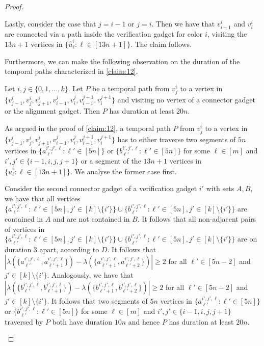 \documentclass[a4paper,UKenglish,cleveref, autoref, thm-restate]{lipics-v2021}
\begin{document}
\begin{proof}
\begin{claimproof}
    Lastly, consider the case that $j=i-1$ or $j=i$. Then we have that $v^i_{i-1}$ and $v^i_i$ are connected via a path inside the verification gadget for color $i$, visiting the $13n+1$ vertices in $\{\hat{u}^i_\ell :  \ell\in[13n+1]\}$. The claim follows.
\end{claimproof}
Furthermore, we can make the following observation on the duration of the temporal paths characterized in \cref{claim:12}.
\begin{claim}\label{claim:13}
    Let $i,j\in\{0,1,\ldots,k\}$. Let $P$ be a temporal path from $v^i_j$ to a vertex in $\{v^i_{j-1},v^i_j,v^i_{j+1},v^j_{i-1},v^j_i,v^{j+1}_{i-1},v^{j+1}_i\}$ and visiting no vertex of a connector gadget or the alignment gadget. Then $P$ has duration at least $20n$.
\end{claim}
\begin{claimproof}
    As argued in the proof of \cref{claim:12}, a temporal path $P$ from $v^i_j$ to a vertex in $\{v^i_{j-1},v^i_j,v^i_{j+1},v^j_{i-1},v^j_i,v^{j+1}_{i-1},v^{j+1}_i\}$ has to either traverse two segments of $5n$ vertices in $\{a^{i',j',\ell}_{\ell'} :  \ell'\in[5n]\}$ or $\{b^{i',j',\ell}_{\ell'} :  \ell'\in[5n]\}$ for some $\ell\in[m]$ and $i',j'\in\{i-1,i,j,j+1\}$ or a segment of the $13n+1$ vertices in $\{\hat{u}^i_\ell :  \ell\in[13n+1]\}$. We analyse the former case first.
    
    Consider the second connector gadget of a verification gadget $i'$ with sets $A,B$, we have that all vertices $\{a^{i',j',\ell}_{\ell'} :  \ell'\in[5n],j'\in[k]\setminus\{i'\}\}\cup\{b^{i',j',\ell}_{\ell'} :  \ell'\in[5n],j'\in[k]\setminus\{i'\}\}$ are contained in $A$ and are not contained in $B$. It follows that all non-adjacent pairs of vertices in $\{a^{i',j',\ell}_{\ell'} :  \ell'\in[5n],j'\in[k]\setminus\{i'\}\}\cup\{b^{i',j',\ell}_{\ell'} :  \ell'\in[5n],j'\in[k]\setminus\{i'\}\}$ are on duration $3$ apart, according to $D$. It follows that $|\lambda(\{a^{i',j',\ell}_{\ell'},a^{i',j',\ell}_{\ell'+1}\})-\lambda(\{a^{i',j',\ell}_{\ell'+1},a^{i',j',\ell}_{\ell'+2}\})|\ge 2$ for all $\ell'\in[5n-2]$ and $j'\in[k]\setminus\{i'\}$. Analogously, we have that $|\lambda(\{b^{i',j',\ell}_{\ell'},b^{i',j',\ell}_{\ell'+1}\})-\lambda(\{b^{i',j',\ell}_{\ell'+1},b^{i',j',\ell}_{\ell'+2}\})|\ge 2$ for all $\ell'\in[5n-2]$ and $j'\in[k]\setminus\{i'\}$. It follows that two segments of $5n$ vertices in $\{a^{i',j',\ell}_{\ell'} :  \ell'\in[5n]\}$ or $\{b^{i',j',\ell}_{\ell'} :  \ell'\in[5n]\}$ for some $\ell\in[m]$ and $i',j'\in\{i-1,i,j,j+1\}$ traversed by $P$ both have duration $10n$ and hence $P$ has duration at least $20n$.


\end{claimproof}
\end{proof}
\end{document}
